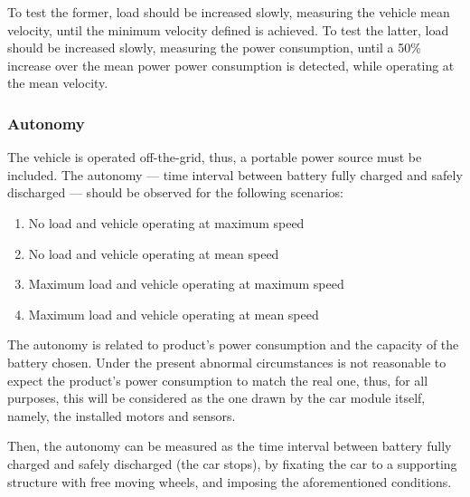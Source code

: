 To test the former, load should be increased slowly, measuring the vehicle
mean velocity, until the minimum velocity defined is achieved. To test the
latter, load should be increased slowly, measuring the power consumption, until
a 50\% increase over the mean power power consumption is detected, while
operating at the mean velocity.

\subsubsection{Autonomy}%
\label{sec:org532616f}
The vehicle is operated off-the-grid, thus, a portable power source must be
included. The autonomy --- time interval between battery fully charged and
safely discharged --- should be observed for the following scenarios:
\begin{enumerate}
\item No load and vehicle operating at maximum speed
\item No load and vehicle operating at mean speed
\item Maximum load and vehicle operating at maximum speed
\item Maximum load and vehicle operating at mean speed
\end{enumerate}
The autonomy is related to product's power consumption and the capacity of the
battery chosen. Under the present abnormal circumstances is not reasonable to
expect the product's power consumption to match the real one, thus, for all
purposes, this will be considered as the one drawn by the car module itself,
namely, the installed motors and sensors.

Then, the autonomy can be measured as
the time interval between battery fully charged and safely discharged (the car
stops), by fixating the car to a supporting structure with free moving wheels,
and imposing the aforementioned conditions.

